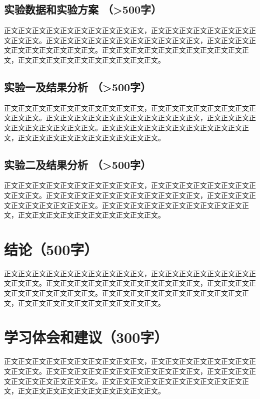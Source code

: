 \documentclass{article}
\begin{document}
\subsection{实验数据和实验方案 （>500字）}
正文正文正文正文正文正文正文正文正文正文，正文正文正文正文正文正文正文正文正文正文。正文正文正文正文正文正文正文正文正文正文正文，正文正文正文正文正文正文正文正文正文正文。正文正文正文正文正文正文正文正文正文正文正文，正文正文正文正文正文正文正文正文正文正文。

\subsection{实验一及结果分析 （>500字）}
正文正文正文正文正文正文正文正文正文正文，正文正文正文正文正文正文正文正文正文正文。正文正文正文正文正文正文正文正文正文正文正文，正文正文正文正文正文正文正文正文正文正文。正文正文正文正文正文正文正文正文正文正文正文，正文正文正文正文正文正文正文正文正文正文。

\subsection{实验二及结果分析 （>500字）}
正文正文正文正文正文正文正文正文正文正文，正文正文正文正文正文正文正文正文正文正文。正文正文正文正文正文正文正文正文正文正文正文，正文正文正文正文正文正文正文正文正文正文。正文正文正文正文正文正文正文正文正文正文正文，正文正文正文正文正文正文正文正文正文正文。

\section{结论（500字）}
正文正文正文正文正文正文正文正文正文正文，正文正文正文正文正文正文正文正文正文正文。正文正文正文正文正文正文正文正文正文正文正文，正文正文正文正文正文正文正文正文正文正文。正文正文正文正文正文正文正文正文正文正文正文，正文正文正文正文正文正文正文正文正文正文。

\section{学习体会和建议（300字）}
正文正文正文正文正文正文正文正文正文正文，正文正文正文正文正文正文正文正文正文正文。正文正文正文正文正文正文正文正文正文正文正文，正文正文正文正文正文正文正文正文正文正文。正文正文正文正文正文正文正文正文正文正文正文，正文正文正文正文正文正文正文正文正文正文。
\end{document}
